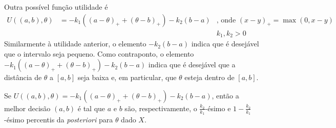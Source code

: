 Outra possível função utilidade é
\begin{align*}
U((a,b),\theta)
&= -k_{1}((a-\theta)_{+} +(\theta-b)_{+}) -k_{2}(b-a)
& \text{, onde } (x-y)_{+} = \max(0,x-y) \\
&& k_{1},k_{2} > 0
\end{align*}
Similarmente à utilidade anterior, 
o elemento $-k_{2}(b-a)$ indica que 
é desejável que o intervalo seja pequeno.
Como contraponto, o elemento 
$-k_{1}((a-\theta)_{+} + (\theta-b)_{+}) -k_{2}(b-a)$
indica que é desejável que 
a distância de $\theta$ a $[a,b]$ seja baixa e,
em particular, que $\theta$ esteja dentro de $[a,b]$.
\begin{theorem}
\label{thm:credible_interval_2}
Se $U((a,b),\theta) =-k_{1}((a-\theta)_{+} + (\theta-b)_{+}) -k_{2}(b-a)$, então
a melhor decisão $(a,b)$ é tal que 
$a$ e $b$ são, respectivamente, o 
$\frac{k_{2}}{k_{1}}$-ésimo
e $1-\frac{k_2}{k_1}$-ésimo 
percentis da \emph{posteriori} para $\theta$ dado $X$.
\end{theorem}
